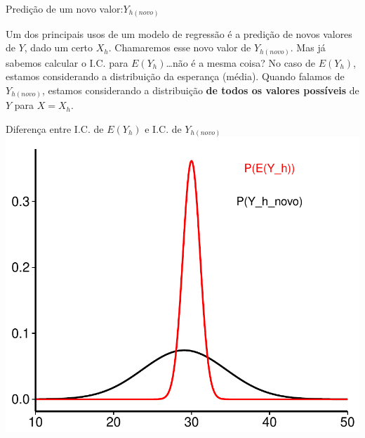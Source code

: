 \documentclass{beamer}\usepackage[]{graphicx}\usepackage[]{color}
\newenvironment{knitrout}{}{} %
\renewenvironment{knitrout}{\setlength{\topsep}{0mm}}{}
\begin{document}
\begin{frame}{Predição de um novo valor:$Y_{h(novo)}$}

Um dos principais usos de um modelo de regressão é a predição de novos valores de $Y$, dado um certo $X_h$. Chamaremos esse novo valor de $Y_{h(novo)}$. \pause
\vfill
Mas já sabemos calcular o I.C. para $E(Y_h)$\ldots não é a mesma coisa? \pause
\vfill
No caso de $E(Y_h)$, estamos considerando a distribuição da esperança (média). Quando falamos de $Y_{h(novo)}$, estamos considerando a  distribuição \textbf{de todos os valores possíveis} de $Y$ para $X = X_h$.

\end{frame}


\begin{frame}[fragile]{Diferença entre I.C. de $E(Y_h)$ e I.C. de $Y_{h(novo)}$}
\centering
\begin{knitrout}
\color{fgcolor}
\includegraphics[width=0.8\linewidth]{figure/unnamed-chunk-7-1} 

\end{knitrout}


\end{frame}
\end{document}
